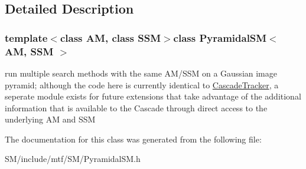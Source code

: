 \subsection{Detailed Description}
\subsubsection*{template$<$class A\-M, class S\-S\-M$>$class Pyramidal\-S\-M$<$ A\-M, S\-S\-M $>$}

run multiple search methods with the same A\-M/\-S\-S\-M on a Gaussian image pyramid; although the code here is currently identical to \hyperlink{classCascadeTracker}{Cascade\-Tracker}, a seperate module exists for future extensions that take advantage of the additional information that is available to the Cascade through direct access to the underlying A\-M and S\-S\-M 

The documentation for this class was generated from the following file\-:\begin{DoxyCompactItemize}
\item 
S\-M/include/mtf/\-S\-M/Pyramidal\-S\-M.\-h\end{DoxyCompactItemize}
